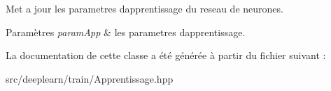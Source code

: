 Met a jour les parametres d\textquotesingle{}apprentissage du reseau de neurones. 


\begin{DoxyParams}{Paramètres}
{\em param\+App} & les parametres d\textquotesingle{}apprentissage. \\
\hline
\end{DoxyParams}


La documentation de cette classe a été générée à partir du fichier suivant \+:\begin{DoxyCompactItemize}
\item 
src/deeplearn/train/Apprentissage.\+hpp\end{DoxyCompactItemize}
